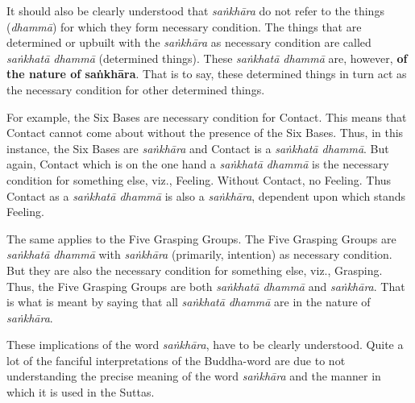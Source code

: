 It should also be clearly understood that \emph{saṅkhāra} do not refer to the things (\emph{dhammā}) for which they form necessary condition. The things that are determined or upbuilt with the \emph{saṅkhāra} as necessary condition are called \emph{saṅkhatā dhammā} (determined things). These \emph{saṅkhatā dhammā} are, however, \textbf{of the nature of saṅkhāra}. That is to say, these determined things in turn act as the necessary condition for other determined things.

For example, the Six Bases are necessary condition for Contact. This means that Contact cannot come about without the presence of the Six Bases. Thus, in this instance, the Six Bases are \emph{saṅkhāra} and Contact is a \emph{saṅkhatā dhammā}. But again, Contact which is on the one hand a \emph{saṅkhatā dhammā} is the necessary condition for something else, viz., Feeling. Without Contact, no Feeling. Thus Contact as a \emph{saṅkhatā dhammā} is also a \emph{saṅkhāra}, dependent upon which stands Feeling.

The same applies to the Five Grasping Groups. The Five Grasping Groups are \emph{saṅkhatā dhammā} with \emph{saṅkhāra} (primarily, intention) as necessary condition. But they are also the necessary condition for something else, viz., Grasping. Thus, the Five Grasping Groups are both \emph{saṅkhatā dhammā} and \emph{saṅkhāra}. That is what is meant by saying that all \emph{saṅkhatā dhammā} are in the nature of \emph{saṅkhāra}.

These implications of the word \emph{saṅkhāra}, have to be clearly understood. Quite a lot of the fanciful interpretations of the Buddha-word are due to not understanding the precise meaning of the word \emph{saṅkhāra} and the manner in which it is used in the Suttas.
